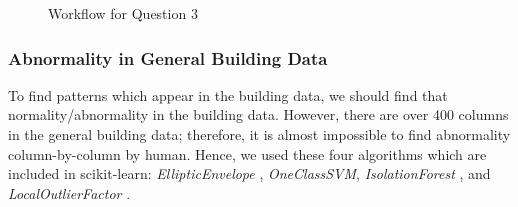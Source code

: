 \documentclass[aps, 10pt, a4paper]{article}
\begin{document}
\begin{figure}[htbp]
                    \caption{Workflow for Question 3}
                    \label{fig:workflow3}
                \end{figure}
            
            \subsubsection{Abnormality in General Building Data}       
                To find patterns which appear in the building data, we should find that normality/abnormality in the building data. However, there are over 400 columns in the general building data; therefore, it is almost impossible to find abnormality column-by-column by human. Hence, we used these four algorithms which are included in scikit-learn: \textit{EllipticEnvelope} \cite{ref:normal1}, \textit{OneClassSVM}, \textit{IsolationForest} \cite{ref:normal2, ref:normal3}, and \textit{LocalOutlierFactor} \cite{ref:normal4}.
                
\end{document}

